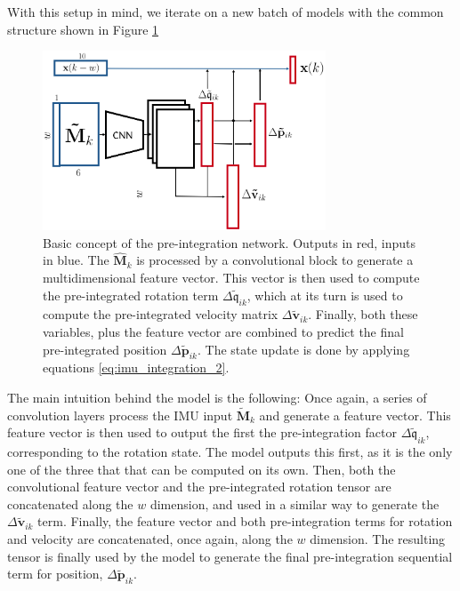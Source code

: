 With this setup in mind, we iterate on a new batch of models with the common structure shown in Figure \ref{fig:basic_pre_integration_model}

\begin{figure}[h]
   \centering
   \includegraphics[width=0.75\textwidth]{img/imu_preintegration_general_net.png}
   \caption{Basic concept of the pre-integration network. Outputs in red, inputs in blue. The $\mathbf{\hat{M}}_k$ is processed by a convolutional block to generate a multidimensional feature vector.
   This vector is then used to compute the pre-integrated rotation term $\Delta\mathfrak{\tilde{q}}_{ik}$, which at its turn is used to compute the pre-integrated velocity matrix $\Delta\mathbf{\tilde{v}}_{ik}$.
   Finally, both these variables, plus the feature vector are combined to predict the final pre-integrated position $\Delta\mathbf{\tilde{p}}_{ik}$. 
   The state update is done by applying equations \ref{eq:imu_integration_2}.}
   \label{fig:basic_pre_integration_model}
\end{figure}

The main intuition behind the model is the following:
Once again, a series of convolution layers process the IMU input $\mathbf{\tilde{M}}_k$ and generate a feature vector. 
This feature vector is then used to output the first the pre-integration factor $\Delta\mathfrak{\tilde{q}}_{ik}$, corresponding to the rotation state. 
The model outputs this first, as it is the only one of the three that that can be computed on its own.
Then, both the convolutional feature vector and the pre-integrated rotation tensor are concatenated along the $w$ dimension, and used in a similar way to generate the $\Delta\mathbf{\tilde{v}}_{ik}$ term.
Finally, the feature vector and both pre-integration terms for rotation and velocity are concatenated, once again, along the $w$ dimension.
The resulting tensor is finally used by the model to generate the final pre-integration sequential term for position, $\Delta\mathbf{\tilde{p}}_{ik}$.

